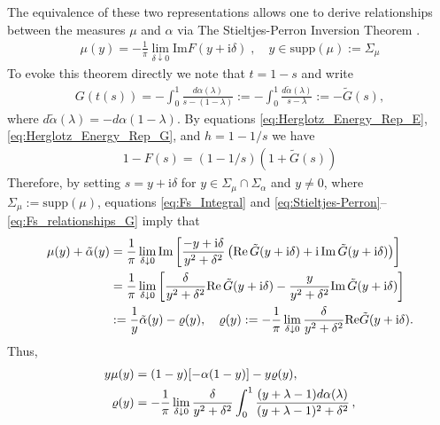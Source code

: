 \documentclass[english,12pt]{ttuthes}
\newcommand{\I}{\mathrm{i}}
\begin{document}
The equivalence of these two representations allows one to derive
relationships between the measures $\mu$ and $\alpha$ via The Stieltjes-Perron
Inversion Theorem \cite{Day:JPCM-96,Henrici:1974:v3,MILTON:2002:TC}. 
%
\begin{align}\label{eq:Stieltjes-Perron}
  \mu(y)=-\frac{1}{\pi}\lim_{\delta\downarrow0}\text{Im}F(y+\I\delta)\;, \quad
  y\in\text{supp}(\mu):=\Sigma_\mu 
\end{align}
%
To evoke this theorem directly we note that $t=1-s$ and write
%
\begin{align}\label{eq:Gts}
  G(t(s))=-\int_0^1\frac{d\alpha(\lambda)}{s-(1-\lambda)}
         :=-\int_0^1\frac{d\tilde{\alpha}(\lambda)}{s-\lambda}
         :=-\tilde{G}(s),
\end{align}
%
where $d\tilde{\alpha}(\lambda)=-d\alpha(1-\lambda)$. By equations
\eqref{eq:Herglotz_Energy_Rep_E}, \eqref{eq:Herglotz_Energy_Rep_G},
and $h=1-1/s$ we have  
%
\begin{align}\label{eq:Fs_relationships_G}
  1-F(s)=(1-1/s)(1+\tilde{G}(s))
\end{align}
%
Therefore, by setting $s=y+\I\delta$ for $y\in\Sigma_\mu\cap\Sigma_\alpha$ and $y\neq0$, where
$\Sigma_\mu:=\text{supp}(\mu)$, equations 
\eqref{eq:Fs_Integral} and
\eqref{eq:Stieltjes-Perron}--\eqref{eq:Fs_relationships_G} imply that
%
\begin{align}
  \mu(y)+\tilde{\alpha}(y)&=\frac{1}{\pi}\lim_{\delta\downarrow 0}\text{Im}
        \left[ \frac{-y+\I\delta}{y^2+\delta^2}
          \left(\text{Re}\,\tilde{G}(y+\I\delta)+\I\,\text{Im}\,\tilde{G}(y+\I\delta)
          \right)\right]\\
       &=\frac{1}{\pi}\lim_{\delta\downarrow 0}
        \left[\frac{\delta}{y^2+\delta^2}\text{Re}\,\tilde{G}(y+\I\delta) 
          -\frac{y}{y^2+\delta^2}\text{Im}\,\tilde{G}(y+\I\delta)
          \right]\notag \\
          &:= \frac{1}{y}\tilde{\alpha}(y)-\varrho(y),\notag
  \quad \varrho(y):=-\frac{1}{\pi}\lim_{\delta\downarrow 0}
  \frac{\delta}{y^2+\delta^2}\text{Re}\tilde{G}(y+\I\delta).\notag 
\end{align}
%
Thus,
%
\begin{align}\label{eq:BM_measure_relationship_E}
  y\mu(y)&=(1-y)[-\alpha(1-y)] - y\varrho(y), \\
  \varrho(y)&=-\frac{1}{\pi}\lim_{\delta\downarrow 0}\frac{\delta}{y^2+\delta^2}
  \int_0^1\frac{(y+\lambda-1)d\alpha(\lambda)}{(y+\lambda-1)^2+\delta^2}\,,\notag
\end{align}
\end{document}
